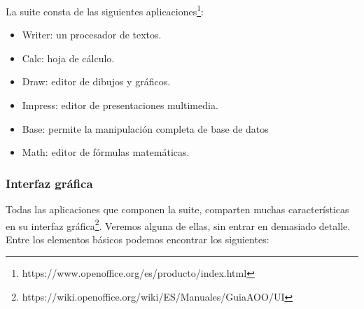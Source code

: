 \documentclass[12pt]{article}
\begin{document}
La suite consta de las siguientes aplicaciones\footnote{https://www.openoffice.org/es/producto/index.html}:
\begin{itemize}
\item Writer: un procesador de textos.
\item Calc: hoja de cálculo.
\item Draw: editor de dibujos y gráficos.
\item Impress: editor de presentaciones multimedia.
\item Base: permite la manipulación completa de base de datos
\item Math: editor de fórmulas matemáticas.
\end{itemize}

\subsubsection*{Interfaz gráfica}

Todas las aplicaciones que componen la suite, comparten muchas características en su interfaz gráfica\footnote{https://wiki.openoffice.org/wiki/ES/Manuales/GuiaAOO/UI}. Veremos alguna de ellas, sin entrar en demasiado detalle. Entre los elementos básicos podemos encontrar los siguientes:
\end{document}
